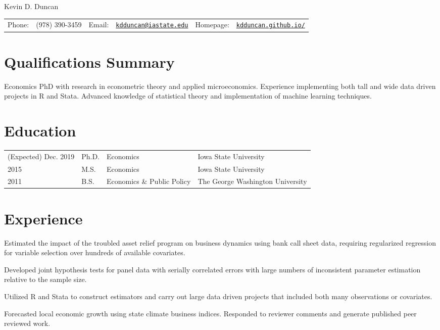 \documentclass[letterpaper]{article}
\def\name{Kevin D. Duncan}
\renewenvironment{itemize}{
  \begin{list}{}{
    \setlength{\leftmargin}{0em}
  }
}{
  \end{list}
}
\begin{document}
{\huge \name}


\vspace{0.25in}

\begin{minipage}{\linewidth}
  \begin{tabular}{llllll}
    Phone: & (978) 390-3459 & 
    Email: & \href{mailto:kdduncan@iastate.edu}{\tt kdduncan@iastate.edu} & 
    Homepage: & \href{kdduncan.github.io/}{\tt kdduncan.github.io/} \\
  \end{tabular}
\end{minipage}

\section*{Qualifications Summary}

Economics PhD with research in econometric theory and applied microeconomics. Experience implementing both tall and wide data driven projects in R and Stata. Advanced knowledge of statistical theory and implementation of machine learning techniques.

\section*{Education}

\begin{tabular}{@{}llll}
(Expected) Dec. 2019  & Ph.D. &Economics &Iowa State University \\
2015 & M.S. &Economics &Iowa State University \\
2011 & B.S. &Economics \& Public Policy &The George Washington University
\end{tabular}


\section*{Experience}
\begin{itemize}
\item Estimated the impact of the troubled asset relief program on business dynamics using bank call sheet data, requiring regularized regression for variable selection over hundreds of available covariates. 
\item Developed joint hypothesis tests for panel data with serially correlated errors with large numbers of inconsistent parameter estimation relative to the sample size.
\item Utilized R and Stata to construct estimators and carry out large data driven projects that included both many observations or covariates.
\item Forecasted local economic growth using state climate business indices. Responded to reviewer comments and generate published peer reviewed work.
\end{itemize}
\end{document}
